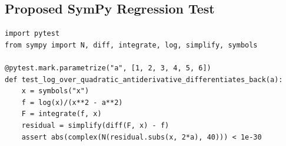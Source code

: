 \documentclass[11pt]{article}
\begin{document}
\subsection{Proposed SymPy Regression Test}

\medskip

\begin{lstlisting}[style=bugpython]
import pytest
from sympy import N, diff, integrate, log, simplify, symbols

@pytest.mark.parametrize("a", [1, 2, 3, 4, 5, 6])
def test_log_over_quadratic_antiderivative_differentiates_back(a):
    x = symbols("x")
    f = log(x)/(x**2 - a**2)
    F = integrate(f, x)
    residual = simplify(diff(F, x) - f)
    assert abs(complex(N(residual.subs(x, 2*a), 40))) < 1e-30
\end{lstlisting}
\end{document}

